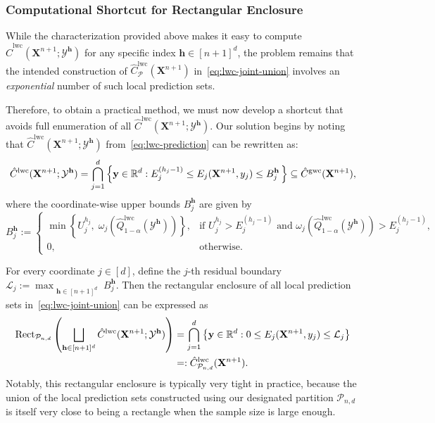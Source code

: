 \subsubsection{Computational Shortcut for Rectangular Enclosure}

{\color{blue}
While the characterization provided above makes it easy to compute $\hat{C}^{\mathrm{lwc}}(\mathbf{X}^{n+1};\mathcal{Y}^{\mathbf{h}})$ for any specific index $\mathbf{h} \in [n+1]^d$, the problem remains that the intended construction of $\hat{C}^{\mathrm{lwc}}_{\mathcal{P}}(\mathbf{X}^{n+1})$ in~\eqref{eq:lwc-joint-union} involves an {\em exponential} number of such local prediction sets. 

Therefore, to obtain a practical method, we must now develop a shortcut that avoids full enumeration of all $\hat{C}^{\mathrm{lwc}}(\mathbf{X}^{n+1};\mathcal{Y}^{\mathbf{h}})$.
Our solution begins by noting that $\hat{C}^{\mathrm{lwc}}(\mathbf{X}^{n+1};\mathcal{Y}^{\mathbf{h}})$ from~\eqref{eq:lwc-prediction} can be rewritten as:
\[
\hat{C}^\mathrm{lwc}(\mathbf{X}^{n+1}; \mathcal{Y}^{\mathbf{h}}) = \bigcap_{j=1}^d \left\{ \mathbf y\in\mathbb{R}^d : E^{(h_j-1)}_j \leq E_j(\mathbf{X}^{n+1},y_j) \leq B^{\mathbf{h}}_j \,\right\} \subseteq \hat{C}^\mathrm{gwc}(\mathbf{X}^{n+1}), 
\]
where the coordinate-wise upper bounds $B^{\mathbf{h}}_j$ are given by
\begin{equation} \label{eq:rect-wise-bounds}
B^{\mathbf{h}}_j := 
\begin{cases}
\min\left\{U^{h_j}_j,\; \omega_j(\hat{Q}^{\mathrm{lwc}}_{1-\alpha}(\mathcal{Y}^{\mathbf{h}}))\right\},
& \text{if } U^{h_j}_j > E^{(h_j-1)}_j \text{ and } \omega_j(\hat{Q}^{\mathrm{lwc}}_{1-\alpha}(\mathcal{Y}^{\mathbf{h}})) > E^{(h_j-1)}_j,\\[0.4em]
0, & \text{otherwise.}
\end{cases}
\end{equation}

For every coordinate $j \in [d]$, define the $j$-th residual boundary $\mathcal{L}_j := \max_{\substack{\mathbf{h} \in [n+1]^d}}B^{\mathbf{h}}_j$. 
Then the rectangular enclosure of all local prediction sets in~\eqref{eq:lwc-joint-union} can be expressed as
\begin{equation}
\begin{aligned}
    \mathrm{Rect}_{\mathcal{P}_{n,d}}\left(\bigsqcup_{\mathbf{h} \in [n+1]^d} \hat{C}^\mathrm{lwc}(\mathbf{X}^{n+1};\mathcal{Y}^{\mathbf{h}})\right) &= \bigcap_{j=1}^d \left\{ \mathbf y\in\mathbb{R}^d : 0 \leq E_j(\mathbf{X}^{n+1},y_j) \leq \mathcal{L}_j \right\}\\
&=: \hat{C}^\mathrm{lwc}_{\mathcal{P}_{n,d}}(\mathbf{X}^{n+1}).
\end{aligned}
\end{equation}
Notably, this rectangular enclosure is typically very tight in practice, because the union of the local prediction sets constructed using our designated partition $\mathcal{P}_{n,d}$ is itself very close to being a rectangle when the sample size is large enough.}

